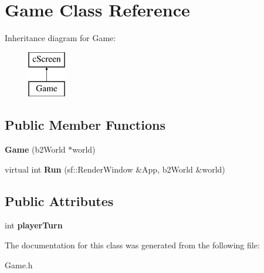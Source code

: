 \hypertarget{class_game}{}\section{Game Class Reference}
\label{class_game}
Inheritance diagram for Game\+:\begin{figure}[H]
\begin{center}
\leavevmode
\includegraphics[height=2.000000cm]{class_game}
\end{center}
\end{figure}
\subsection*{Public Member Functions}
\begin{DoxyCompactItemize}
\item 
{\bfseries Game} (b2\+World $\ast$world)\hypertarget{class_game_a3567e32ed8275d47cbc6c1a7fc7d1ecd}{}\label{class_game_a3567e32ed8275d47cbc6c1a7fc7d1ecd}

\item 
virtual int {\bfseries Run} (sf\+::\+Render\+Window \&App, b2\+World \&world)\hypertarget{class_game_ae660cfb534ad3fbddc04ab102c4bfc47}{}\label{class_game_ae660cfb534ad3fbddc04ab102c4bfc47}

\end{DoxyCompactItemize}
\subsection*{Public Attributes}
\begin{DoxyCompactItemize}
\item 
int {\bfseries player\+Turn}\hypertarget{class_game_a10b241dce8e33c30c469881e00d058b9}{}\label{class_game_a10b241dce8e33c30c469881e00d058b9}

\end{DoxyCompactItemize}


The documentation for this class was generated from the following file\+:\begin{DoxyCompactItemize}
\item 
Game.\+h\end{DoxyCompactItemize}
